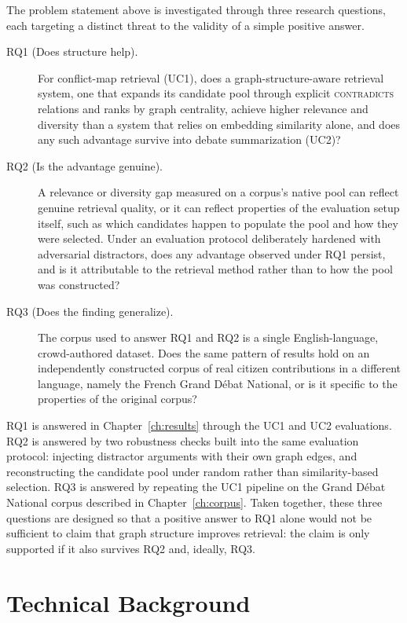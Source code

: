 The problem statement above is investigated through three research questions, each targeting a
distinct threat to the validity of a simple positive answer.

\begin{description}
\item[RQ1 (Does structure help).] For conflict-map retrieval (UC1), does a graph-structure-aware
  retrieval system, one that expands its candidate pool through explicit \textsc{contradicts}
  relations and ranks by graph centrality, achieve higher relevance and diversity than a system
  that relies on embedding similarity alone, and does any such advantage survive into debate
  summarization (UC2)?

\item[RQ2 (Is the advantage genuine).] A relevance or diversity gap measured on a corpus's native
  pool can reflect genuine retrieval quality, or it can reflect properties of the evaluation setup
  itself, such as which candidates happen to populate the pool and how they were selected. Under
  an evaluation protocol deliberately hardened with adversarial distractors, does any advantage
  observed under RQ1 persist, and is it attributable to the retrieval method rather than to how
  the pool was constructed?

\item[RQ3 (Does the finding generalize).] The corpus used to answer RQ1 and RQ2 is a single
  English-language, crowd-authored dataset. Does the same pattern of results hold on an
  independently constructed corpus of real citizen contributions in a different language, namely
  the French Grand D\'ebat National, or is it specific to the properties of the original corpus?
\end{description}

RQ1 is answered in Chapter~\ref{ch:results} through the UC1 and UC2 evaluations. RQ2 is answered
by two robustness checks built into the same evaluation protocol: injecting distractor arguments
with their own graph edges, and reconstructing the candidate pool under random rather than
similarity-based selection. RQ3 is answered by repeating the UC1 pipeline on the Grand D\'ebat
National corpus described in Chapter~\ref{ch:corpus}. Taken together, these three questions are
designed so that a positive answer to RQ1 alone would not be sufficient to claim that graph
structure improves retrieval: the claim is only supported if it also survives RQ2 and, ideally,
RQ3.

\section{Technical Background}
\label{sec:background}

